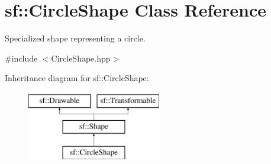 \hypertarget{classsf_1_1_circle_shape}{}\section{sf\+:\+:Circle\+Shape Class Reference}
\label{classsf_1_1_circle_shape}


Specialized shape representing a circle.  




{\ttfamily \#include $<$Circle\+Shape.\+hpp$>$}

Inheritance diagram for sf\+:\+:Circle\+Shape\+:\begin{figure}[H]
\begin{center}
\leavevmode
\includegraphics[height=3.000000cm]{classsf_1_1_circle_shape}
\end{center}
\end{figure}
